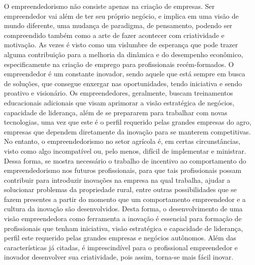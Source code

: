 O empreendedorismo não consiste apenas na criação de empresas. Ser empreendedor vai além de ter seu próprio negócio, e implica em uma visão de mundo diferente, uma mudança de paradigma, de pensamento, podendo ser compreendido também como a arte de fazer acontecer com criatividade e motivação. As vezes é visto como um vislumbre de esperança que pode trazer alguma contribuição para a melhoria da dinâmica e do desempenho econômico, especificamente na criação de emprego para profissionais recém-formados. O empreendedor é um constante inovador, sendo aquele que está sempre em busca de soluções, que consegue enxergar nas oportunidades, tendo iniciativa e sendo proativo e visionário. Os empreendedores, geralmente, buscam treinamentos educacionais adicionais que visam aprimorar a visão estratégica de negócios, capacidade de liderança, além de se prepararem para trabalhar com novas tecnologias, uma vez que este é o perfil requerido pelas grandes empresas do agro, empresas que dependem diretamente da inovação para se manterem competitivas. No entanto, o empreendedorismo no setor agrícola é, em certas circunstâncias, visto como algo incompatível ou, pelo menos, difícil de implementar e ministrar. Dessa forma, se mostra necessário o trabalho de incentivo ao comportamento do empreendedorismo nos futuros profissionais, para que tais profissionais possam contribuir para introduzir inovações na empresa na qual trabalha, ajudar a solucionar problemas da propriedade rural, entre outras possibilidades que se fazem presentes a partir do momento que um comportamento empreendedor e a cultura da inovação são desenvolvidos. Desta forma, o desenvolvimento de uma visão empreendedora como ferramenta a inovação é essencial para formação de profissionais que tenham iniciativa, visão estratégica e capacidade de liderança, perfil este requerido pelas grandes empresas e negócios autônomos. Além das características já citadas, é imprescindível para o profissional empreendedor e inovador desenvolver sua criatividade, pois assim, torna-se mais fácil inovar. 


